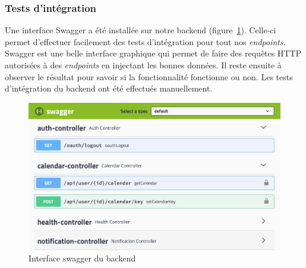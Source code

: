         \subsubsection{Tests d'intégration}
        Une interface Swagger a été installée sur notre backend (figure~\ref{fig.swagger}). Celle-ci permet d'effectuer facilement des tests d'intégration pour tout nos \emph{endpoints}. Swagger est une belle interface graphique qui permet de faire des requêtes HTTP autorisées à des \emph{endpoints} en injectant les bonnes données. Il reste ensuite à observer le résultat pour savoir si la fonctionnalité fonctionne ou non. Les tests d'intégration du backend ont été effectués manuellement.
        
        \begin{figure}[hp] \centering
            \centering
            \includegraphics[width=\textwidth]{Figures/swagger}
            \caption{Interface swagger du backend}
            \label{fig.swagger}
        \end{figure}
        
                